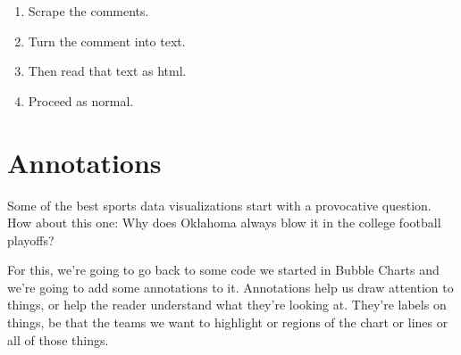 \documentclass[
]{book}
\newenvironment{Shaded}{\begin{snugshade}}{\end{snugshade}}
\newcommand{\CommentTok}[1]{\textcolor[rgb]{0.56,0.35,0.01}{\textit{#1}}}
\newcommand{\DataTypeTok}[1]{\textcolor[rgb]{0.13,0.29,0.53}{#1}}
\newcommand{\KeywordTok}[1]{\textcolor[rgb]{0.13,0.29,0.53}{\textbf{#1}}}
\newcommand{\NormalTok}[1]{#1}
\newcommand{\OperatorTok}[1]{\textcolor[rgb]{0.81,0.36,0.00}{\textbf{#1}}}
\newcommand{\StringTok}[1]{\textcolor[rgb]{0.31,0.60,0.02}{#1}}
\providecommand{\tightlist}{%
  \setlength{\itemsep}{0pt}\setlength{\parskip}{0pt}}
\begin{document}
\begin{enumerate}
\def\labelenumi{\arabic{enumi}.}
\tightlist
\item
  Scrape the comments.
\item
  Turn the comment into text.
\item
  Then read that text as html.
\item
  Proceed as normal.
\end{enumerate}

\begin{Shaded}
\end{Shaded}

\hypertarget{annotations}{%
\chapter{Annotations}\label{annotations}}

Some of the best sports data visualizations start with a provocative question. How about this one: Why does Oklahoma always blow it in the college football playoffs?

For this, we're going to go back to some code we started in Bubble Charts and we're going to add some annotations to it. Annotations help us draw attention to things, or help the reader understand what they're looking at. They're labels on things, be that the teams we want to highlight or regions of the chart or lines or all of those things.
\end{document}
